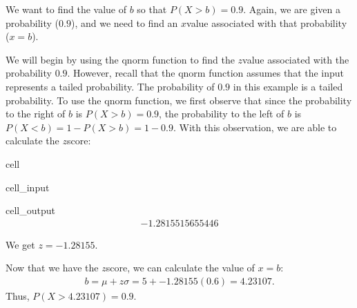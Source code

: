 \documentclass[letterpaper,10pt,english]{jupyterBook}
\begin{document}
\sphinxAtStartPar
We want to find the value of \(b\) so that \(P(X > b) = 0.9\). Again, we are given a probability (\(0.9\)), and we need to find an \(x\)\sphinxhyphen{}value associated with that probability (\(x = b\)).

\sphinxAtStartPar
We will begin by using the qnorm function to find the \(z\)\sphinxhyphen{}value associated with the probability \(0.9\). However, recall that the qnorm function assumes that the input represents a \sphinxhyphen{}tailed probability. The probability of \(0.9\) in this example is a \sphinxhyphen{}tailed probability. To use the qnorm function, we first observe that since the probability to the right of \(b\) is \(P(X > b) = 0.9\), the probability to the left of \(b\) is \(P(X < b) = 1 - P(X > b) = 1 - 0.9\). With this observation, we are able to calculate the \(z\)\sphinxhyphen{}score:

\begin{sphinxuseclass}{cell}\begin{sphinxVerbatimInput}

\begin{sphinxuseclass}{cell_input}
\begin{sphinxVerbatim}[commandchars=\\\{\}]
\end{sphinxVerbatim}

\end{sphinxuseclass}\end{sphinxVerbatimInput}
\begin{sphinxVerbatimOutput}

\begin{sphinxuseclass}{cell_output}\begin{equation*}
\begin{split}-1.2815515655446\end{split}
\end{equation*}
\end{sphinxuseclass}\end{sphinxVerbatimOutput}

\end{sphinxuseclass}
\sphinxAtStartPar
We get \(z = -1.28155\).

\sphinxAtStartPar
Now that we have the \(z\)\sphinxhyphen{}score, we can calculate the value of \(x = b\):
\begin{equation*}
\begin{split} b = \mu + z\sigma = 5 + -1.28155(0.6) = 4.23107. \end{split}
\end{equation*}
\sphinxAtStartPar
Thus, \(P(X > 4.23107) = 0.9\).
\end{document}
